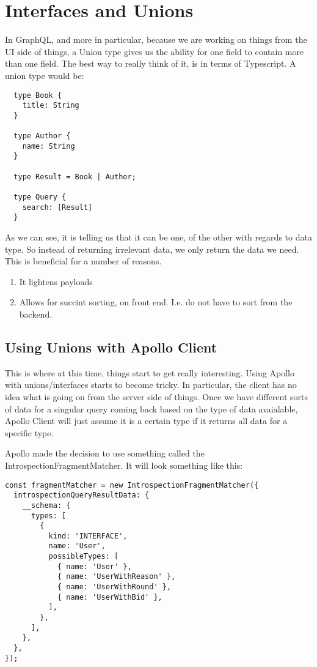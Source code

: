 
\section{ Interfaces and Unions }

In GraphQL, and more in particular, because we are working on things from the
UI side of things, a Union type gives us the ability for one field to contain
more than one field. The best way to really think of it, is in terms of
Typescript. A union type would be:
\begin{lstlisting}
  type Book {
    title: String
  }

  type Author {
    name: String
  }

  type Result = Book | Author;

  type Query {
    search: [Result]
  }
\end{lstlisting}

As we can see, it is telling us that it can be one, of the other with regards
to data type. So instead of returning irrelevant data, we only return the data
we need. This is beneficial for a number of reasons.
\begin{enumerate}
  \item It lightens payloads
  \item Allows for succint sorting, on front end. I.e. do not have to sort from
  the backend.
\end{enumerate}

\subsection{ Using Unions with Apollo Client }
This is where at this time, things start to get really interesting. Using Apollo
with unions/interfaces starts to become tricky. In particular, the client has
no idea what is going on from the server side of things. Once we have different
sorts of data for a singular query coming back based on the type of data
avaialable, Apollo Client will just assume it is a certain type if it returns
all data for a specific type.

Apollo made the decision to use something called the
IntrospectionFragmentMatcher. It will look something like this:
\begin{lstlisting}
const fragmentMatcher = new IntrospectionFragmentMatcher({
  introspectionQueryResultData: {
    __schema: {
      types: [
        {
          kind: 'INTERFACE',
          name: 'User',
          possibleTypes: [
            { name: 'User' },
            { name: 'UserWithReason' },
            { name: 'UserWithRound' },
            { name: 'UserWithBid' },
          ],
        },
      ],
    },
  },
});
\end{lstlisting}


